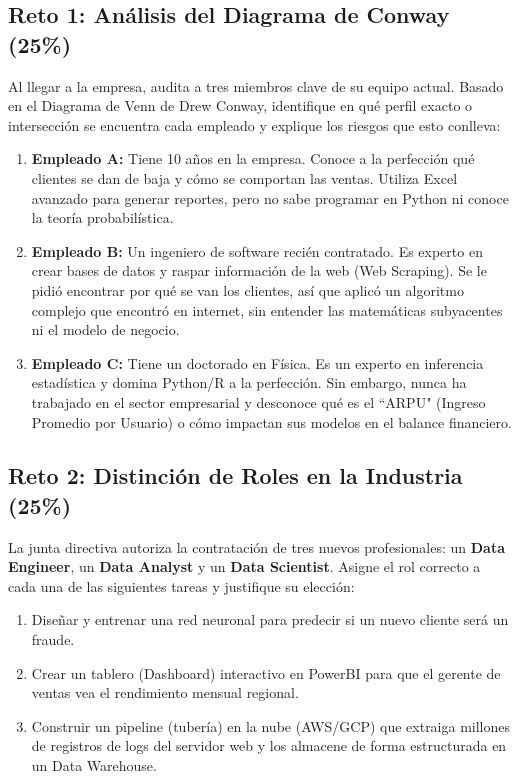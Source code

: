 \documentclass[12pt,a4paper]{article}
\begin{document}
\subsection*{Reto 1: Análisis del Diagrama de Conway (25\%)}
Al llegar a la empresa, audita a tres miembros clave de su equipo actual. Basado en el Diagrama de Venn de Drew Conway, identifique en qué perfil exacto o intersección se encuentra cada empleado y explique los riesgos que esto conlleva:
\begin{enumerate}
    \item \textbf{Empleado A:} Tiene 10 años en la empresa. Conoce a la perfección qué clientes se dan de baja y cómo se comportan las ventas. Utiliza Excel avanzado para generar reportes, pero no sabe programar en Python ni conoce la teoría probabilística.
    \item \textbf{Empleado B:} Un ingeniero de software recién contratado. Es experto en crear bases de datos y raspar información de la web (Web Scraping). Se le pidió encontrar por qué se van los clientes, así que aplicó un algoritmo complejo que encontró en internet, sin entender las matemáticas subyacentes ni el modelo de negocio.
    \item \textbf{Empleado C:} Tiene un doctorado en Física. Es un experto en inferencia estadística y domina Python/R a la perfección. Sin embargo, nunca ha trabajado en el sector empresarial y desconoce qué es el ``ARPU" (Ingreso Promedio por Usuario) o cómo impactan sus modelos en el balance financiero.
\end{enumerate}

\subsection*{Reto 2: Distinción de Roles en la Industria (25\%)}
La junta directiva autoriza la contratación de tres nuevos profesionales: un \textbf{Data Engineer}, un \textbf{Data Analyst} y un \textbf{Data Scientist}. Asigne el rol correcto a cada una de las siguientes tareas y justifique su elección:
\begin{enumerate}
    \item Diseñar y entrenar una red neuronal para predecir si un nuevo cliente será un fraude.
    \item Crear un tablero (Dashboard) interactivo en PowerBI para que el gerente de ventas vea el rendimiento mensual regional.
    \item Construir un pipeline (tubería) en la nube (AWS/GCP) que extraiga millones de registros de logs del servidor web y los almacene de forma estructurada en un Data Warehouse.
\end{enumerate}
\end{document}
